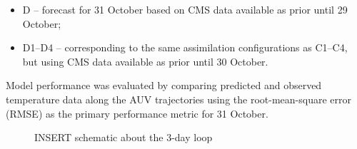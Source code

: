 \begin{itemize}
    \item D – forecast for 31 October based on CMS data available as prior until 29 October;
    \item D1–D4 – corresponding to the same assimilation
      configurations as C1–C4, but using CMS data available as prior until 30
      October.
\end{itemize}

Model performance was evaluated by comparing predicted and observed
temperature data along the AUV trajectories using the root-mean-square
error (RMSE) as the primary performance metric for 31 October.

\begin{figure}
    \centering
    \caption{INSERT schematic about the 3-day loop}
    \label{fig:temperatureprofiles}
\end{figure}


%
    



